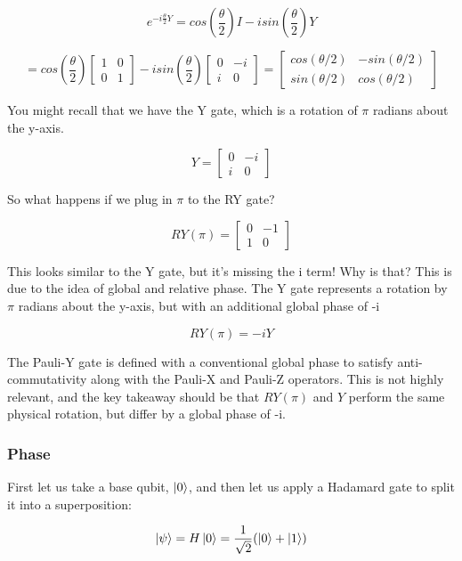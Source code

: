 \documentclass[12pt]{article}
\begin{document}
$$
e^{-i \frac{\theta}{2} Y} = cos(\frac{\theta}{2})I - isin(\frac{\theta}{2})Y
$$

$$
= cos(\frac{\theta}{2})\begin{bmatrix}
1 & 0 \\
0 &  1
\end{bmatrix} - isin(\frac{\theta}{2})\begin{bmatrix}
0 & -i \\
i &  0
\end{bmatrix} = \begin{bmatrix}
cos(\theta / 2) & -sin(\theta / 2) \\
sin(\theta / 2) &  cos(\theta / 2)
\end{bmatrix}
$$

You might recall that we have the Y gate, which is a rotation of $\pi$ radians about the y-axis.

$$
Y = \begin{bmatrix}
0 & -i \\
i & 0
\end{bmatrix}
$$

So what happens if we plug in $\pi$ to the RY gate?

$$
RY(\pi) =
\begin{bmatrix}
0 & -1 \\
1 &  0
\end{bmatrix}
$$

This looks similar to the Y gate, but it's missing the i term! Why is that? This is due to the idea of global and relative phase. The Y gate represents a rotation by $\pi$ radians about the y-axis, but with an additional global phase of -i

$$
RY(\pi) = -iY
$$

The Pauli-Y gate is defined with a conventional global phase to satisfy anti-commutativity along with the Pauli-X and Pauli-Z operators. This is not highly relevant, and the key takeaway should be that $RY(\pi)$ and $Y$ perform the same physical rotation, but differ by a global phase of -i.

\subsubsection{Phase}

First let us take a base qubit, $\ket{0}$, and then let us apply a Hadamard gate to split it into a superposition:

$$
\ket{\psi} = H\ket{0} = \frac{1}{\sqrt{2}}( \ket{0}  + \ket{1})
$$
\end{document}
